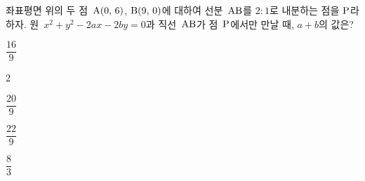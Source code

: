 좌표평면 위의 두 점~$\mathrm{A}(0,\mkern3mu 6)$, $\mathrm{B}(9,\mkern3mu 0)$에 대하여 선분~$\mathrm{AB}$를 $2:1$로 내분하는 점을 $\mathrm{P}$라 하자. 원~$x^2+y^2-2ax-2by=0$과 직선~$\mathrm{AB}$가 점~$\mathrm{P}$에서만 만날 때, $a+b$의 값은? 
\begin{choices32}{\rule[-3ex]{0pt}{8ex}$\dfrac{16}{9}$}{\rule[-3ex]{0pt}{8ex}$2$}{\rule[-3ex]{0pt}{8ex}$\dfrac{20}{9}$}{\rule[-3ex]{0pt}{8ex}$\dfrac{22}{9}$}{\rule[-3ex]{0pt}{8ex}$\dfrac{8}{3}$}\end{choices32}

